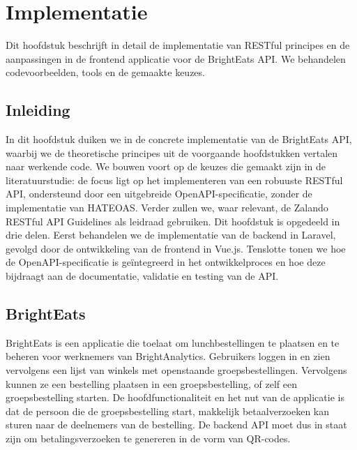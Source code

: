 
\chapter{Implementatie}
\label{ch:implementatie}

Dit hoofdstuk beschrijft in detail de implementatie van RESTful principes en de aanpassingen in de frontend applicatie voor de Bright\-Eats API. We behandelen codevoorbeelden, tools en de gemaakte keuzes.

\section{Inleiding}

In dit hoofdstuk duiken we in de concrete implementatie van de Bright\-Eats API, waarbij we de theoretische principes uit de voorgaande hoofdstukken vertalen naar werkende code. We bouwen voort op de keuzes die gemaakt zijn in de literatuurstudie: de focus ligt op het implementeren van een robuuste RESTful API, ondersteund door een uitgebreide OpenAPI-specificatie, zonder de implementatie van HATEOAS. Verder zullen we, waar relevant, de Zalando RESTful API Guidelines als leidraad gebruiken. Dit hoofdstuk is opgedeeld in drie delen. Eerst behandelen we de implementatie van de backend in Laravel, gevolgd door de ontwikkeling van de frontend in Vue.js. Tenslotte tonen we hoe de OpenAPI-specificatie is geïntegreerd in het ontwikkelproces en hoe deze bijdraagt aan de documentatie, validatie en testing van de API.

\section{BrightEats}

Bright\-Eats is een applicatie die toelaat om lunchbestellingen te plaatsen en te beheren voor werknemers van BrightAnalytics. Gebruikers loggen in en zien vervolgens een lijst van winkels met openstaande groepsbestellingen. Vervolgens kunnen ze een bestelling plaatsen in een groepsbestelling, of zelf een groepsbestelling starten. De hoofdfunctionaliteit en het nut van de applicatie is dat de persoon die de groepsbestelling start, makkelijk betaalverzoeken kan sturen naar de deelnemers van de bestelling. De backend API moet dus in staat zijn om betalingsverzoeken te genereren in de vorm van QR-codes.


